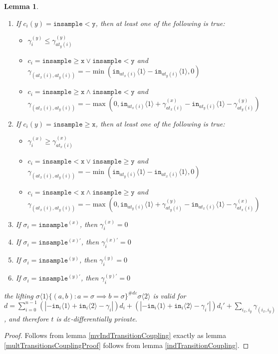 \documentclass[12pt]{article}
\newcommand{\gguard}[1][x]{\texttt{insample}\geq #1}
\newcommand{\lguard}[1][x]{\texttt{insample} < #1}
\newcommand{\brangle}[1]{\langle #1 \rangle}
\newtheorem{lemma}[thm]{Lemma}
\theoremstyle{definition}
\begin{document}
\begin{lemma}
\begin{enumerate}
        \item If $c_i(y) = \lguard[\texttt{y}]$, then at least one of the following is true: \begin{itemize}
            \item $\gamma_i^{(y)}\leq \gamma^{(y)}_{at_y(i)}$
            \item $c_i = \gguard[\texttt{x}]\lor\lguard[\texttt{y}]$ and $\gamma_{(at_x(i), at_y(i))} = -\min(\texttt{in}_{at_x(i)}\brangle{1}-\texttt{in}_{at_y(i)}\brangle{1}, 0)$
            \item $c_i = \gguard[\texttt{x}]\land\lguard[\texttt{y}]$ and $\gamma_{(at_x(i), at_y(i))} = -\max(0, \texttt{in}_{at_x(i)}\brangle{1}+ \gamma_{at_x(i)}^{(x)}-\texttt{in}_{at_y(i)}\brangle{1}-\gamma_{at_y(i)}^{(y)})$
        \end{itemize}
        \item If $c_i(y) = \gguard[\texttt{x}]$, then at least one of the following is true: \begin{itemize}
            \item $\gamma_i^{(x)}\geq \gamma^{(x)}_{at_x(i)}$
            \item $c_i = \lguard[\texttt{x}]\lor\gguard[\texttt{y}]$ and $\gamma_{(at_x(i), at_y(i))} = -\min(\texttt{in}_{at_y(i)}\brangle{1}-\texttt{in}_{at_x(i)}\brangle{1}, 0)$
            \item $c_i = \lguard[\texttt{x}]\land\gguard[\texttt{y}]$ and $\gamma_{(at_x(i), at_y(i))} = -\max(0, \texttt{in}_{at_y(i)}\brangle{1}+ \gamma_{at_y(i)}^{(y)}-\texttt{in}_{at_x(i)}\brangle{1}-\gamma_{at_x(i)}^{(x)})$
        \end{itemize}
        \item If $\sigma_i = \texttt{insample}^{(x)}$, then $\gamma_i^{(x)}=0$
        \item If $\sigma_i = \texttt{insample}^{(x)\prime}$, then $\gamma_i^{(x)\prime}=0$
        \item If $\sigma_i = \texttt{insample}^{(y)}$, then $\gamma_i^{(y)}=0$
        \item If $\sigma_i = \texttt{insample}^{(y)\prime}$, then $\gamma_i^{(y)\prime}=0$
    \end{enumerate}
      the lifting $\sigma\brangle{1}\{(a, b): a=\sigma\implies b=\sigma\}^{\#d\varepsilon}\sigma\brangle{2}$ is valid for $d = \sum_{i=0}^{n-1}(|-\texttt{in}_i\brangle{1}+\texttt{in}_i\brangle{2}-\gamma_i|)d_i+(|-\texttt{in}_i\brangle{1}+\texttt{in}_i\brangle{2}-\gamma_i'|)d_i' + \sum_{i_x, i_y}\gamma_{(i_x, i_y)}$, and therefore $t$ is $d\varepsilon$-differentially private. 
\end{lemma}
\begin{proof}
    Follows from lemma \ref{mvIndTransitionCoupling} exactly as lemma \ref{multTransitionsCouplingProof} follows from lemma \ref{indTransitionCoupling}.
\end{proof}
\end{document}
